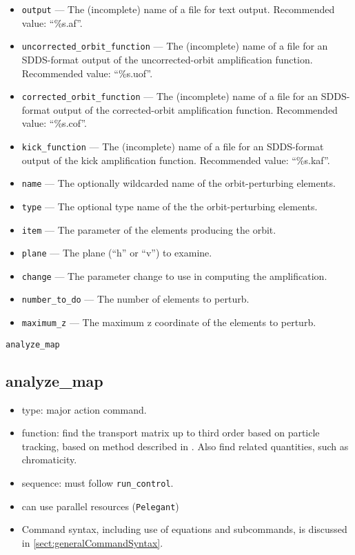 \documentclass[11pt]{article}
\begin{document}
\begin{itemize}
\item \verb|output| ---  The (incomplete) name of a file for text output.   Recommended value: ``\%s.af''.
\item \verb|uncorrected_orbit_function| --- The (incomplete) name of a file for an SDDS-format output of the
    uncorrected-orbit amplification function.  Recommended value: ``\%s.uof''.
\item \verb|corrected_orbit_function| --- The (incomplete) name of a file for an SDDS-format output of the
    corrected-orbit amplification function.  Recommended value: ``\%s.cof''.
\item \verb|kick_function| --- The (incomplete) name of a file for an SDDS-format output of the kick amplification function.
Recommended value: ``\%s.kaf''.
\item \verb|name| --- The optionally wildcarded name of the orbit-perturbing elements.  
\item \verb|type| --- The optional type name of the the orbit-perturbing elements.
\item \verb|item| --- The parameter of the elements producing the orbit.
\item \verb|plane| --- The plane (``h'' or ``v'') to examine.
\item \verb|change| --- The parameter change to use in computing the amplification.  
\item \verb|number_to_do| --- The number of elements to perturb.
\item \verb|maximum_z| --- The maximum z coordinate of the elements to perturb.
\end{itemize}

\newpage
\begin{center}{\Large\verb|analyze_map|}\end{center}
\subsection{analyze\_map \label{subsec:analyzemap}}

\begin{itemize}
\item type: major action command.
\item function: find the transport matrix up to third order based on particle tracking, based on method described
  in \cite{Borland_thesis}.
  Also find related quantities, such as chromaticity.
\item sequence: must follow \verb|run_control|.
\item can use parallel resources (\verb|Pelegant|)
\item Command syntax, including use of equations and subcommands, is discussed in \ref{sect:generalCommandSyntax}.
\end{itemize}
\end{document}

